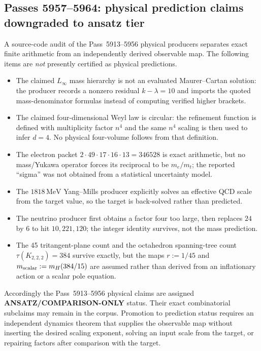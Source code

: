 \subsection*{Passes 5957--5964: physical prediction claims downgraded to ansatz tier}

A source-code audit of the Pass~5913--5956 physical producers separates exact
finite arithmetic from an independently derived observable map.  The following
items are \emph{not} presently certified as physical predictions.

\begin{itemize}
\item The claimed $L_\infty$ mass hierarchy is not an evaluated
Maurer--Cartan solution: the producer records a nonzero residual $k-\lambda=10$
and imports the quoted mass-denominator formulas instead of computing verified
higher brackets.
\item The claimed four-dimensional Weyl law is circular: the refinement
function is defined with multiplicity factor $n^4$ and the same $n^4$ scaling is
then used to infer $d=4$.  No physical four-volume follows from that definition.
\item The electron packet
$2\cdot49\cdot17\cdot16\cdot13=346528$ is exact arithmetic, but no mass/Yukawa
operator forces its reciprocal to be $m_e/m_t$; the reported ``sigma'' was not
obtained from a statistical uncertainty model.
\item The $1818\,\mathrm{MeV}$ Yang--Mills producer explicitly solves an
effective QCD scale from the target value, so the target is back-solved rather
than predicted.
\item The neutrino producer first obtains a factor four too large, then replaces
$24$ by $6$ to hit $10{,}221{,}120$; the integer identity survives, not the mass
prediction.
\item The 45 tritangent-plane count and the octahedron spanning-tree count
$\tau(K_{2,2,2})=384$ survive exactly, but the maps
$r:=1/45$ and $m_{\rm scalar}:=m_H(384/15)$ are assumed rather than derived from
an inflationary action or a scalar pole equation.
\end{itemize}

Accordingly the Pass~5913--5956 physical claims are assigned
\textbf{ANSATZ/COMPARISON-ONLY} status.  Their exact combinatorial subclaims may
remain in the corpus.  Promotion to prediction status requires an independent
dynamics theorem that supplies the observable map without inserting the desired
scaling exponent, solving an input scale from the target, or repairing factors
after comparison with the target.
